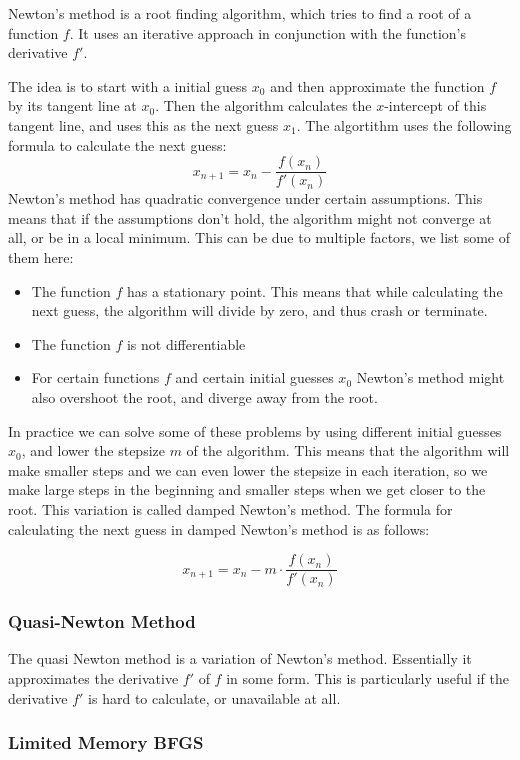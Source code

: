 Newton's method is a root finding algorithm, which tries to find a root of a function $f$. It uses an iterative approach in conjunction with the function's derivative $f'$. 

The idea is to start with a initial guess $x_0$ and then approximate the function $f$ by its tangent line at $x_0$. Then the algorithm calculates the $x$-intercept of this tangent line, and uses this as the next guess $x_1$. 
The algortithm uses the following formula to calculate the next guess:
\[
    x_{n+1} = x_n - \frac{f(x_n)}{f'(x_n)}  
\]
Newton's method has quadratic convergence under certain assumptions. This means that if the assumptions don't hold, the algorithm might not converge at all, or be in a local minimum. This can be due to multiple factors, we 
list some of them here:

\begin{itemize}
    \item The function $f$ has a stationary point. This means that while calculating the next guess, the algorithm will divide by zero, and thus crash or terminate.
    \item The function $f$ is not differentiable
    \item For certain functions $f$ and certain initial guesses $x_0$ Newton's method might also overshoot the root, and diverge away from the root.
\end{itemize}

In practice we can solve some of these problems by using different initial guesses $x_0$, and lower the stepsize $m$ of the algorithm. This means that the algorithm will make smaller steps and we can even lower the stepsize 
in each iteration, so we make large steps in the beginning and smaller steps when we get closer to the root. This variation is called damped Newton's method. The formula for calculating the next guess in damped Newton's method is as follows:

\[
    x_{n+1} = x_n - m \cdot \frac{f(x_n)}{f'(x_n)}
\]

\subsubsection{Quasi-Newton Method}

The quasi Newton method is a variation of Newton's method. Essentially it approximates the derivative $f'$ of $f$ in some form. This is particularly useful if the derivative $f'$ is hard to calculate, or unavailable at all.

\subsubsection{Limited Memory BFGS}

